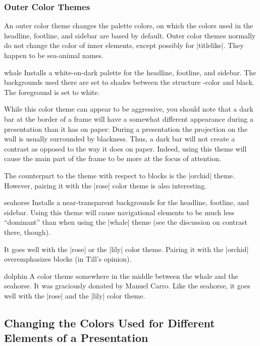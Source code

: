 \subsubsection{Outer Color Themes}

An outer color theme changes the palette colors, on which the colors used in the headline, footline, and sidebar are based by default. Outer color themes normally do not change the color of inner elements, except possibly for |titlelike|. They happen to be sea-animal names.

\begin{colorthemeexample}{whale}
  Installs a white-on-dark palette for the headline, footline, and sidebar. The backgrounds used there are set to shades between the structure \beamer-color and black. The foreground is set to white.

  While this color theme can appear to be aggressive, you should note that a dark bar at the border of a frame will have a somewhat different appearance during a presentation than it has on paper: During a presentation the projection on the wall is usually surrounded by blackness. Thus, a dark bar will not create a contrast as opposed to the way it does on paper. Indeed, using this theme will cause the main part of the frame to be more at the focus of attention.

  The counterpart to the theme with respect to blocks is the |orchid| theme. However, pairing it with the |rose| color theme is also interesting.
\end{colorthemeexample}

\begin{colorthemeexample}{seahorse}
  Installs a near-transparent backgrounds for the headline, footline, and sidebar. Using this theme will cause navigational elements to be much less ``dominant'' than when using the |whale| theme (see the discussion on contrast there, though).

  It goes well with the |rose| or the |lily| color theme. Pairing it with the |orchid| overemphasizes blocks (in Till's opinion).
\end{colorthemeexample}

\begin{colorthemeexample}{dolphin}
  A color theme somewhere in the middle between the whale and the seahorse. It was graciously donated by Manuel Carro. Like the seahorse, it goes well with the |rose| and the |lily| color theme.
\end{colorthemeexample}


\subsection{Changing the Colors Used for Different Elements of a Presentation}

